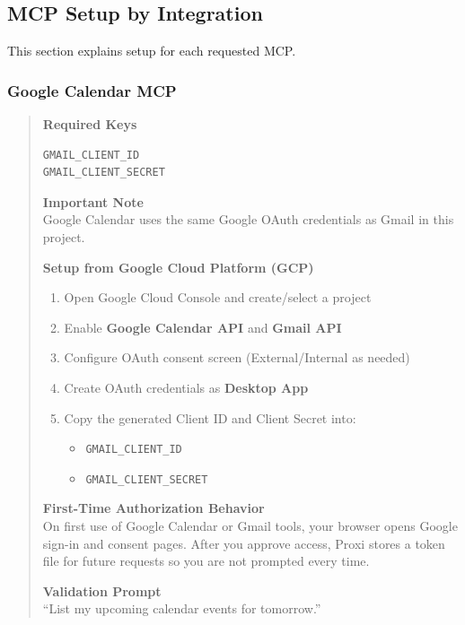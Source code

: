 \documentclass{article}
\begin{document}
\subsection{MCP Setup by Integration}

This section explains setup for each requested MCP.

\subsubsection{Google Calendar MCP}
\begin{quote}
\noindent\textbf{Required Keys}
\begin{verbatim}
GMAIL_CLIENT_ID
GMAIL_CLIENT_SECRET
\end{verbatim}

\noindent\textbf{Important Note}\\
Google Calendar uses the same Google OAuth credentials as Gmail in this project.

\noindent\textbf{Setup from Google Cloud Platform (GCP)}
\begin{enumerate}
	\item Open Google Cloud Console and create/select a project
	\item Enable \textbf{Google Calendar API} and \textbf{Gmail API}
	\item Configure OAuth consent screen (External/Internal as needed)
	\item Create OAuth credentials as \textbf{Desktop App}
	\item Copy the generated Client ID and Client Secret into:
	\begin{itemize}
		\item \texttt{GMAIL\_CLIENT\_ID}
		\item \texttt{GMAIL\_CLIENT\_SECRET}
	\end{itemize}
\end{enumerate}

\medskip
\noindent\textbf{First-Time Authorization Behavior}\\
On first use of Google Calendar or Gmail tools, your browser opens Google sign-in and consent pages. After you approve access, Proxi stores a token file for future requests so you are not prompted every time.

\medskip
\noindent\textbf{Validation Prompt}\\
``List my upcoming calendar events for tomorrow.''
\end{quote}
\end{document}
